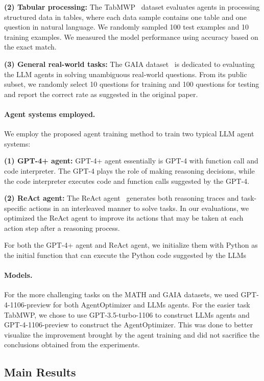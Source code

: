 \documentclass{article}
\theoremstyle{plain}
\theoremstyle{definition}
\theoremstyle{remark}
\begin{document}
\textbf{(2) Tabular processing:} 
The TabMWP~\cite{lu2023dynamic} dataset evaluates agents in processing structured data in tables, where each data sample contains one table and one question in natural language. We randomly sampled 100 test examples and 10 training examples. We measured the model performance using accuracy based on the exact match.

\textbf{(3) General real-world tasks:} The GAIA dataset~\cite{mialon2023gaia} is dedicated to evaluating the LLM agents in solving unambiguous real-world questions. From its public subset, we randomly select 10 questions for training and 100 questions for testing and report the correct rate as suggested in the original paper. 

\paragraph{Agent systems employed.}
We employ the proposed agent training method to train two typical LLM agent systems:

\textbf{(1) GPT-4+ agent:}  GPT-4+ agent essentially is GPT-4 with function call and code interpreter.
The GPT-4 plays the role of making reasoning decisions, while the code interpreter executes code and function calls suggested by the GPT-4.

\textbf{(2) ReAct agent:}  The ReAct agent~\cite{yao2022react} generates both reasoning traces and task-specific actions in an interleaved manner to solve tasks. In our evaluations, we optimized the ReAct agent to improve its actions that may be taken at each action step after a reasoning process.

For both the GPT-4+ agent and ReAct agent, we initialize them with Python as the initial function that can execute the Python code suggested by the LLMs


\paragraph{Models.}
For the more challenging tasks on the MATH and GAIA datasets, we used GPT-4-1106-preview for both AgentOptimizer and LLMs agents. For the easier task TabMWP, we chose to use GPT-3.5-turbo-1106 to construct LLMs agents and GPT-4-1106-preview to construct the AgentOptimizer. This was done to better visualize the improvement brought by the agent training and did not sacrifice the conclusions obtained from the experiments.

\subsection{Main Results}
\label{section_main_result}
\end{document}
